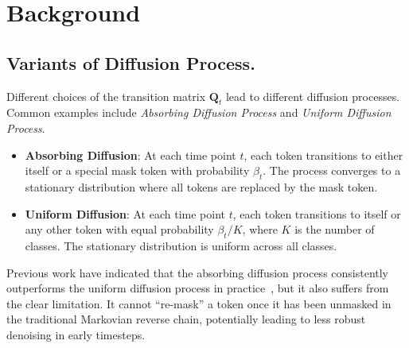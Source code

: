 \section{Background}
\subsection{Variants of Diffusion Process.}
Different choices of the transition matrix \(\mathbf{Q}_t\) lead to different diffusion processes. Common examples include \textit{Absorbing Diffusion Process} and \textit{Uniform Diffusion Process}.
\begin{itemize}
    \item \textbf{Absorbing Diffusion}: At each time point \(t\), each token transitions to either itself or a special mask token with probability \(\beta_t\). The process converges to a stationary distribution where all tokens are replaced by the mask token.
    \item \textbf{Uniform Diffusion}: At each time point \(t\), each token transitions to itself or any other token with equal probability \(\beta_t / K\), where \(K\) is the number of classes. The stationary distribution is uniform across all classes.
\end{itemize}

Previous work have indicated that the absorbing diffusion process consistently outperforms the uniform diffusion process in practice~\citep{mdlm, udlm, d3pm}, but it also suffers from the clear limitation. It cannot ``re-mask'' a token once it has been unmasked in the traditional Markovian reverse chain, potentially leading to less robust denoising in early timesteps.



